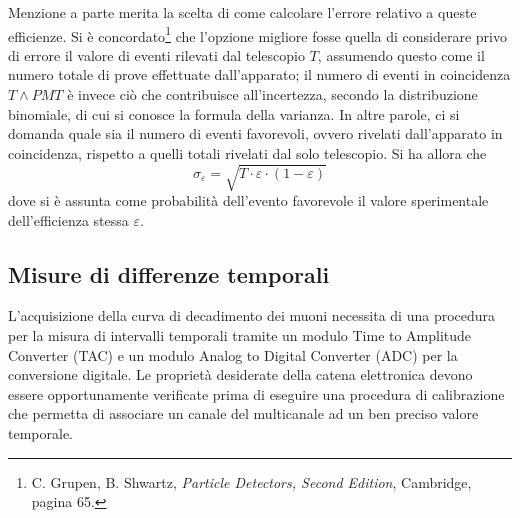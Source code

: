 \documentclass[11pt, oneside, a4paper]{article}   	%
\begin{document}
Menzione a parte merita la scelta di come calcolare l'errore relativo a queste efficienze. Si è concordato\footnote{C. Grupen, B. Shwartz, \textit{Particle Detectors, Second Edition}, Cambridge, pagina 65.} che l'opzione migliore fosse quella di considerare privo di errore il valore di eventi rilevati dal telescopio $T$, assumendo questo come il numero totale di prove effettuate dall'apparato; il numero di eventi in coincidenza $T\wedge PMT$ è invece ciò che contribuisce all'incertezza, secondo la distribuzione binomiale, di cui si conosce la formula della varianza. In altre parole, ci si domanda quale sia il numero di eventi favorevoli, ovvero rivelati dall'apparato in coincidenza, rispetto a quelli totali rivelati dal solo telescopio. Si ha allora che 
\[\sigma_\varepsilon = \sqrt{T \cdot \varepsilon \cdot  (1-\varepsilon)}\]
dove si è assunta come probabilità dell'evento favorevole il valore sperimentale dell'efficienza stessa $\varepsilon$.

%
\subsection{Misure di differenze temporali}
L'acquisizione della curva di decadimento dei muoni necessita di una procedura per la misura di intervalli temporali tramite un modulo Time to Amplitude Converter (TAC) e un modulo Analog to Digital Converter (ADC) per la conversione digitale. Le proprietà desiderate della catena elettronica devono essere opportunamente verificate prima di eseguire una procedura di calibrazione che permetta di associare un canale del multicanale ad un ben preciso valore temporale.
\end{document}
